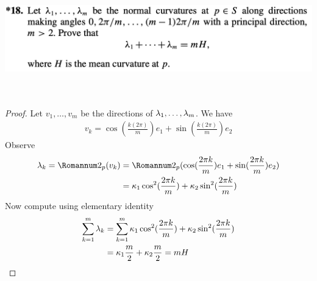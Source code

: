 \documentclass{report}
\begin{document}
\begin{question}{}{}
\includegraphics[height=5cm,width=18cm]{hw5q6}
\end{question}
\begin{proof}
Let $v_1,\dots,v_m$ be the directions of $\lambda _1,\dots ,\lambda _m$. We have 
\begin{align*}
v_k= \cos (\frac{k(2\pi )}{m})e_1 + \sin (\frac{k(2\pi)}{m})e_2
\end{align*}
Observe 
\begin{align*}
\ld_k =\Sec_p(v_k)&= \Sec_p ( \cos (\frac{2\pi k}{m})e_1 + \sin (\frac{2\pi k}{m})e_2)\\
&= \kappa_1 \cos^2 (\frac{2\pi k}{m})+ \kappa_2 \sin^2 (\frac{2\pi k}{m})
\end{align*}
Now compute using elementary identity
\begin{align*}
\sum_{k=1}^m \lambda_k &=\sum_{k=1}^m \kappa_1 \cos^2 (\frac{2\pi k}{m})+ \kappa_2 \sin^2 (\frac{2\pi k}{m})\\
&= \kappa_1 \frac{m}{2}+ \kappa_2 \frac{m}{2}=mH
\end{align*}
\end{proof}
\end{document}
